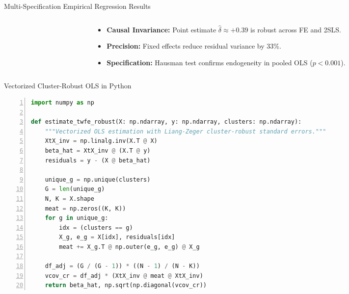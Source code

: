 \documentclass[aspectratio=169, 9pt]{beamer}
\begin{document}
\begin{frame}{Multi-Specification Empirical Regression Results}
\begin{columns}[c]
\begin{column}{0.56\textwidth}
        \end{column}
        \begin{column}{0.42\textwidth}
            \par\vspace{0.3em}
            \scriptsize
            \begin{itemize}\setlength{\itemsep}{2pt}
                \item \textbf{Causal Invariance:} Point estimate $\hat{\delta} \approx +0.39$ is robust across FE and 2SLS.
                \item \textbf{Precision:} Fixed effects reduce residual variance by $33\%$.
                \item \textbf{Specification:} Hausman test confirms endogeneity in pooled OLS ($p < 0.001$).
            \end{itemize}
        \end{column}
    \end{columns}
\end{frame}

\begin{frame}[fragile]{Vectorized Cluster-Robust OLS in Python}
\begin{lstlisting}[language=Python, basicstyle=\ttfamily\scriptsize, keywordstyle=\color{accent}\bfseries, commentstyle=\color{structure!60}\itshape, stringstyle=\color{journalblue}, frame=single, rulecolor=\color{structure!20}, backgroundcolor=\color{structure!3}, numbers=left, numberstyle=\tiny\color{structure!50}]
import numpy as np

def estimate_twfe_robust(X: np.ndarray, y: np.ndarray, clusters: np.ndarray):
    """Vectorized OLS estimation with Liang-Zeger cluster-robust standard errors."""
    XtX_inv = np.linalg.inv(X.T @ X)
    beta_hat = XtX_inv @ (X.T @ y)
    residuals = y - (X @ beta_hat)
    
    unique_g = np.unique(clusters)
    G = len(unique_g)
    N, K = X.shape
    meat = np.zeros((K, K))
    for g in unique_g:
        idx = (clusters == g)
        X_g, e_g = X[idx], residuals[idx]
        meat += X_g.T @ np.outer(e_g, e_g) @ X_g
        
    df_adj = (G / (G - 1)) * ((N - 1) / (N - K))
    vcov_cr = df_adj * (XtX_inv @ meat @ XtX_inv)
    return beta_hat, np.sqrt(np.diagonal(vcov_cr))
\end{lstlisting}
\end{frame}

\end{document}
